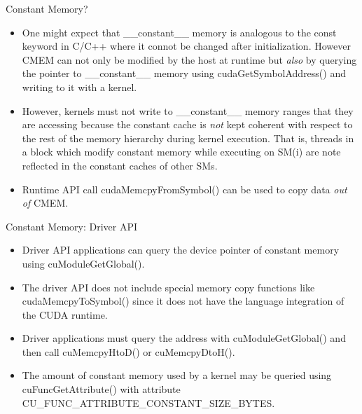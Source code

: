 \documentclass[handout]{beamer}
\begin{document}
\begin{frame}{Constant Memory?}
\begin{itemize}
\itemsep1em
	\item<1->One might expect that {\selectfont \_\_constant\_\_} memory is analogous to the {\selectfont const} keyword in C/C++ where it connot be changed after initialization.  However CMEM can not only be modified by the host at runtime but \emph{also} by querying the pointer to {\selectfont \_\_constant\_\_} memory using {\selectfont cudaGetSymbolAddress()} and writing to it with a kernel.  
	\item<1->However, kernels must not write to {\selectfont \_\_constant\_\_} memory ranges that they are accessing because the constant cache is \emph{not} kept coherent with respect to the rest of the memory hierarchy during kernel execution.  That is, threads in a block which modify constant memory while executing on SM(i) are note reflected in the constant caches of other SMs.
	\item<1->Runtime API call {\selectfont cudaMemcpyFromSymbol()} can be used to copy data \emph{out of} CMEM.
\end{itemize}
\end{frame}


\begin{frame}{Constant Memory: Driver API}
\begin{itemize}
\itemsep1em
	\item<1->Driver API applications can query the device pointer of constant memory using {\selectfont cuModuleGetGlobal()}.
	\item<1->The driver API does not include special memory copy functions like {\selectfont cudaMemcpyToSymbol()} since it does not have the language integration of the CUDA runtime.
	\item<1->Driver applications must query the address with {\selectfont cuModuleGetGlobal()} and then call {\selectfont cuMemcpyHtoD()} or {\selectfont cuMemcpyDtoH()}.
	\item<1->The amount of constant memory used by a kernel may be queried using {\selectfont cuFuncGetAttribute()} with attribute {\selectfont CU\_FUNC\_ATTRIBUTE\_CONSTANT\_SIZE\_BYTES}.
\end{itemize}
\end{frame}
\end{document}
